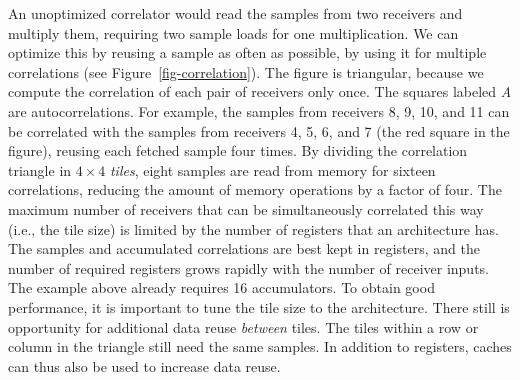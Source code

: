 \documentclass{article}
\begin{document}
An unoptimized correlator would read the samples from two receivers and
multiply them, requiring two sample loads for one multiplication.
We can optimize this by reusing a sample 
as often as possible, by using it for multiple correlations (see
Figure~\ref{fig-correlation}).
The figure is triangular, because we compute
the correlation of each pair of receivers only once. The squares labeled \emph{A} are
autocorrelations.
For example, the samples from receivers 8, 9, 10, and 11 can be correlated
with the samples from receivers 4, 5, 6, and 7 (the red square in the figure),
reusing each fetched sample four times.
By dividing the correlation triangle in $4\times4$ \emph{tiles}, eight samples are read from memory for sixteen
correlations, reducing the amount of memory operations by a factor
of four.
The maximum number of receivers that can
be simultaneously correlated this way (i.e., the tile size) is limited by the number of registers that an architecture has.
The samples and accumulated correlations are best kept in registers, and the number of
required registers grows rapidly with the number of receiver inputs.
The example above already requires 16 accumulators.
To obtain good performance, it is important to tune the tile size to the
architecture.
There still is
opportunity for additional data reuse \emph{between} tiles.  The tiles
within a row or column in the triangle still need the same samples.
In addition to registers, caches can thus also be used to increase
data reuse. 


\end{document}
